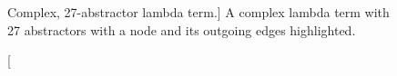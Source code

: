 \begin{figure}[htbp]
	\centering
	\caption
	[Complex, 27-abstractor lambda term.]
	{A complex lambda term with 27 abstractors with a node and its outgoing
	edges highlighted.}
	\label{fig:images_highlighted_node_DOT}
\end{figure}
